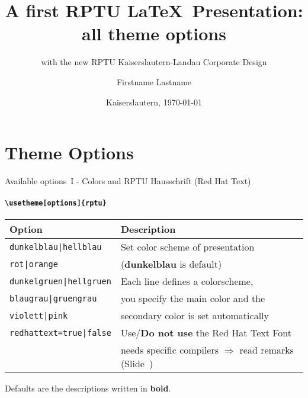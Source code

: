 \documentclass[aspectratio=169]{beamer}
\title[RPTU \LaTeX\ Presentation]{A first RPTU \LaTeX\ Presentation: \\ all theme options}
\subtitle{with the new RPTU Kaiserslautern-Landau Corporate Design}
\date{Kaiserslautern, \today}
\author[Last Name]{Firstname Lastname}
\institute[Short Institute]{Institute}
\begin{document}
\begin{frame}
	\titlepage
\end{frame}

\section{Theme Options}
\rptusectionpage

\begin{frame}{Available options~I - Colors and RPTU Hausschrift (Red Hat Text)}
	\framesubtitle{\texttt{\textbackslash usetheme[options]\{rptu\}}}
	\begin{tabular}{ll}
		\textbf{Option} & \textbf{Description}\\ \toprule
		\texttt{dunkelblau|hellblau} & Set color scheme of presentation\\
		\texttt{rot|orange} & (\textbf{dunkelblau} is default)\\
		\texttt{dunkelgruen|hellgruen} & Each line defines a colorscheme,\\
		\texttt{blaugrau|gruengrau} & you specify the main color and the\\ 
		\texttt{violett|pink} & secondary color is set automatically\\ \midrule		\texttt{redhattext=true|false} & Use/\textbf{Do not use} the Red Hat Text Font \\ & needs specific compilers $\Rightarrow$ read remarks (Slide~\pageref{remarks-font}) \\\bottomrule
	\end{tabular}
	\vspace*{2ex}
	
	Defaults are the descriptions written in \textbf{bold}.
\end{frame}
\end{document}
